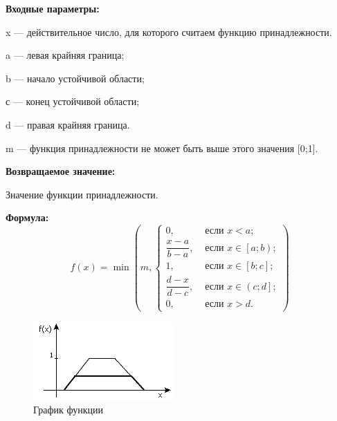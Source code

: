 \textbf{Входные параметры:}
  
x --- действительное число, для которого считаем функцию принадлежности.
 
a --- левая крайняя граница;
 
b --- начало устойчивой области;
 
с --- конец устойчивой области;
 
d --- правая крайняя граница.

m --- функция принадлежности не может быть выше этого значения [0;1].

\textbf{Возвращаемое значение:}
 
Значение функции принадлежности.

\textbf{Формула:}
\begin{equation*}
f\left(x \right)=\min\left(m, \left\lbrace \begin{aligned}  0,& \text{ если } x < a   ; \\\dfrac{x-a}{b-a},& \text{ если } x \in \left[ a; b\right)   ; \\1,& \text{ если } x \in \left[ b; c\right] ; \\\dfrac{d-x}{d-c},& \text{ если } x \in \left( c; d\right]   ; \\ 0,& \text{ если } x >d. \end{aligned}\right.\right) 
\end{equation*}

 \begin{figure} [h] 
   \center
   \includegraphics {HML_TrapeziformTruncatedFuzzyNumber_Graph.png}
   \caption{График функции} 
   \label{img:HML_TrapeziformTruncatedFuzzyNumber_Graph}  
 \end{figure}
